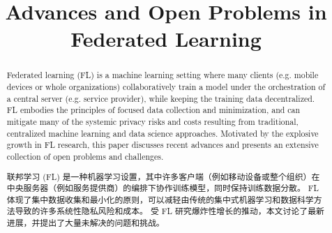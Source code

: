 \documentclass[10pt]{article}
\title{Advances and Open Problems in Federated Learning}
\date{}
\begin{document}
\begin{spacing}{1.1}
\maketitle
\end{spacing}

\begin{abstract}
Federated learning (FL) is a machine learning setting where many clients (e.g. mobile devices or whole organizations) collaboratively train a model under the orchestration of a central server (e.g. service provider), while keeping the training data decentralized. FL embodies the principles of focused data collection and minimization, and can mitigate many of the systemic privacy risks and costs resulting from traditional, centralized machine learning and data science approaches. Motivated by the explosive growth in FL research, this paper discusses recent advances and presents an extensive collection of open problems and challenges. 

联邦学习 (FL) 是一种机器学习设置，其中许多客户端（例如移动设备或整个组织）在中央服务器（例如服务提供商）的编排下协作训练模型，同时保持训练数据分散。 FL 体现了集中数据收集和最小化的原则，可以减轻由传统的集中式机器学习和数据科学方法导致的许多系统性隐私风险和成本。 受 FL 研究爆炸性增长的推动，本文讨论了最新进展，并提出了大量未解决的问题和挑战。
\end{abstract}

\pagebreak

\begin{small}
\tableofcontents
\end{small}


\setlength{\parskip}{0.5em}

\pagebreak















 

 
 


\pagebreak
\end{document}

